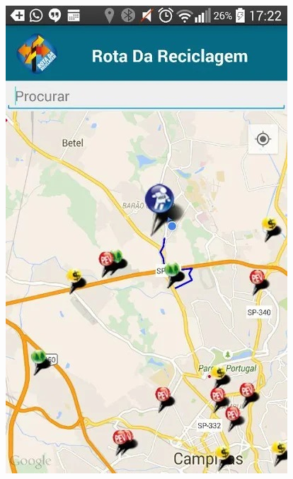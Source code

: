 \documentclass[
	12pt,				%
	openright,			%
	twoside,			%
	a4paper,			%
	english,			%
	french,				%
	spanish,			%
	brazil				%
	]{abntex2}
\begin{document}
\begin{figure}[htb]
\begin{minipage}{0.45\textwidth}
    \includegraphics[scale=0.45]{media/rotaappmap.jpg}
     \label{fig:rota2}
  \end{minipage}
\end{figure}
\end{document}
